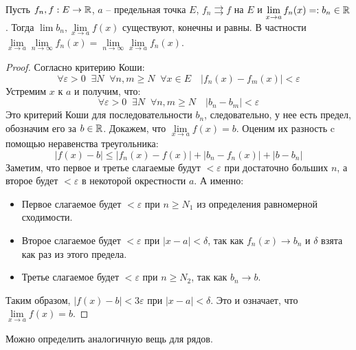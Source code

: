  \begin{theorem}
     Пусть $f_n, f : E \to \mathbb{R}$, $a$ -- предельная точка $E$, $f_n \rightrightarrows f$ на $E$ и $\lim\limits_{x \to a} f_n(x) =: b_n \in \mathbb{R}$. 
     Тогда $\lim b_n, \lim\limits_{x \to a} f(x)$ существуют, конечны и равны.
     В частности $\lim\limits_{x \to a} \lim\limits_{n \to \infty} f_n(x) =  \lim\limits_{n \to \infty} \lim\limits_{x \to a} f_n(x)$.
 \end{theorem}
 \begin{proof}
     Согласно критерию Коши: \[ \forall \varepsilon > 0 \;\; \exists N \;\; \forall n, m \geqslant N \;\; \forall x \in E \quad |f_n(x) - f_m(x)| < \varepsilon \]
     \quad Устремим $x$ к $a$ и получим, что: \[ \forall \varepsilon > 0 \;\; \exists N \;\; \forall n, m \geqslant N \quad |b_n - b_m| < \varepsilon  \]
     \quad Это критерий Коши для последовательности $b_n$, следовательно, у нее есть предел, обозначим его за $b \in \mathbb{R}$.
     Докажем, что $\lim\limits_{x \to a} f(x) = b$. Оценим их разность c помощью неравенства треугольника:
     \[ |f(x) - b| \leqslant |f_n(x) - f(x)| + |b_n - f_n(x)| + |b - b_n| \]
     \quad Заметим, что первое и третье слагаемые будут $< \varepsilon$ при достаточно больших $n$, а второе будет $< \varepsilon$ в некоторой окрестности $a$.
     А именно: \begin{itemize}
         \item Первое слагаемое будет $< \varepsilon$ при $n \geqslant N_1$ из определения равномерной сходимости. 
         \item Второе слагаемое будет $< \varepsilon$ при $|x - a| < \delta$, так как $f_n(x) \to b_n$ и $\delta$ взята как раз из этого предела.
         \item Третье слагаемое будет $< \varepsilon$ при $n \geqslant N_2$, так как $b_n \to b$.
     \end{itemize} 
     \quad Таким образом, $|f(x) - b| < 3\varepsilon$ при $|x - a| < \delta$. Это и означает, что $\lim\limits_{x \to a} f(x) = b$.
 \end{proof}

\vspace*{7mm}

Можно определить аналогичную вещь для рядов.

